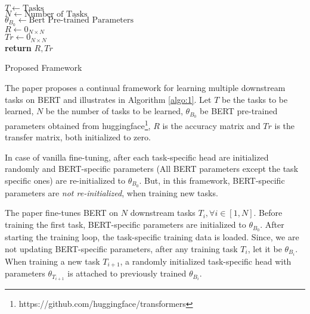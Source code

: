 \documentclass[11pt,a4paper]{article}
\begin{document}
\begin{algorithm}
    $T \leftarrow \mbox{Tasks}$ \\
    $N \leftarrow \mbox{Number of Tasks}$ \\
    $\theta_{B_0} \leftarrow \mbox{Bert Pre-trained Parameters}$\\
    $R \leftarrow 0_{N \times N}$ \\
    $Tr \leftarrow 0_{N \times N}$ \\
    \textbf{return} $R, Tr$
    \caption{Proposed Framework}
    \label{algo:1}
\end{algorithm}

The paper proposes a continual framework for learning multiple downstream tasks on BERT and illustrates in Algorithm \ref{algo:1}. Let $T$ be the tasks to be learned, $N$ be the number of tasks to be learned, $\theta_{B_0}$ be BERT pre-trained parameters obtained from huggingface\footnote{https://github.com/huggingface/transformers}, $R$ is the accuracy matrix and $Tr$ is the transfer matrix, both initialized to zero.

In case of vanilla fine-tuning, after each task-specific head are initialized randomly and BERT-specific parameters (All BERT parameters except the task specific ones) are re-initialized to $\theta_{B_0}$.  But, in this framework, BERT-specific parameters  are \textit{not re-initialized}, when training new tasks.   

The paper fine-tunes BERT on $N$ downstream tasks $T_i, \forall i \in [1, N]$.  Before training the first task, BERT-specific parameters are initialized to $\theta_{B_0}$. After starting the training loop, the task-specific training data is loaded. Since, we are not updating BERT-specific parameters, after any training task $T_i$, let it be $\theta_{B_i}$.  When training a new task $T_{i+1}$, a randomly initialized task-specific head with parameters $\theta_{T_{i+1}}$ is attached to previously trained $\theta_B_{i}$.
\end{document}
